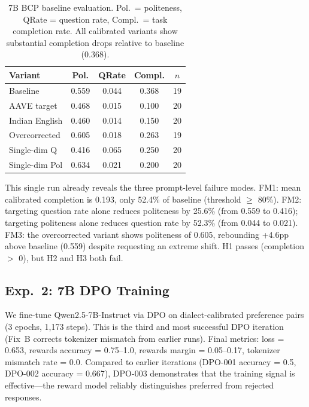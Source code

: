 \documentclass[11pt,a4paper]{article}
\newcommand{\fm}[1]{\textsc{FM#1}}
\newcommand{\bcp}{\textsc{BCP}}
\begin{document}
\begin{table}[t]
\centering
\small
\begin{tabular}{@{}lcccc@{}}
\toprule
\textbf{Variant} & \textbf{Pol.} & \textbf{QRate} & \textbf{Compl.} & $n$ \\
\midrule
Baseline        & 0.559 & 0.044 & 0.368 & 19 \\
AAVE target     & 0.468 & 0.015 & 0.100 & 20 \\
Indian English  & 0.460 & 0.014 & 0.150 & 20 \\
Overcorrected   & 0.605 & 0.018 & 0.263 & 19 \\
Single-dim Q    & 0.416 & 0.065 & 0.250 & 20 \\
Single-dim Pol  & 0.634 & 0.021 & 0.200 & 20 \\
\bottomrule
\end{tabular}
\caption{7B \bcp{} baseline evaluation. Pol.\ = politeness, QRate = question rate, Compl.\ = task completion rate. All calibrated variants show substantial completion drops relative to baseline (0.368).}
\label{tab:7b_baseline}
\end{table}

This single run already reveals the three prompt-level failure modes.
\fm{1}: mean calibrated completion is 0.193, only 52.4\% of baseline (threshold $\geq$ 80\%).
\fm{2}: targeting question rate alone reduces politeness by 25.6\% (from 0.559 to 0.416); targeting politeness alone reduces question rate by 52.3\% (from 0.044 to 0.021).
\fm{3}: the overcorrected variant shows politeness of 0.605, rebounding +4.6pp above baseline (0.559) despite requesting an extreme shift.
H1 passes (completion $>$ 0), but H2 and H3 both fail.

\subsection{Exp.~2: 7B DPO Training}
\label{sec:exp2}

We fine-tune Qwen2.5-7B-Instruct via DPO on dialect-calibrated preference pairs (3 epochs, 1,173 steps).
This is the third and most successful DPO iteration (Fix~B corrects tokenizer mismatch from earlier runs).
Final metrics: loss = 0.653, rewards accuracy = 0.75--1.0, rewards margin = 0.05--0.17, tokenizer mismatch rate = 0.0.
Compared to earlier iterations (DPO-001 accuracy = 0.5, DPO-002 accuracy = 0.667), DPO-003 demonstrates that the training signal is effective---the reward model reliably distinguishes preferred from rejected responses.
\end{document}
